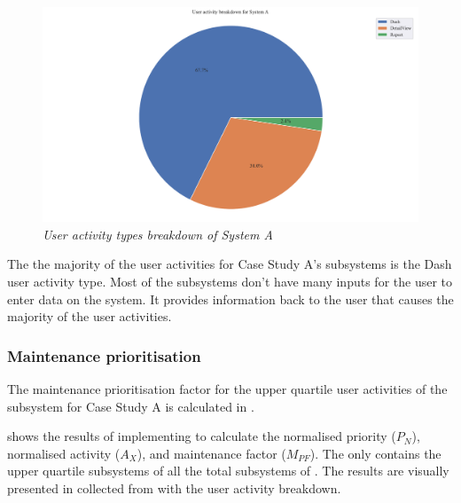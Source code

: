 \begin{figure}[!htb]
	\centering %
	\includegraphics[width=0.95\linewidth]{img/ch3/analysis/case_A_breakdown.pdf}
	\caption[User activity types breakdown of System A]
	{\textit{User activity types breakdown of System A}}\label{fig:ch3_caseABreakdown}
\end{figure} 

\clearpage

The  the majority of the user activities for Case Study A's subsystems is the Dash user activity type. Most of the subsystems don't have many inputs for the user to enter data on the system. It provides information back to the user that causes the majority of the user activities. 

\subsubsection{Maintenance prioritisation}
The maintenance prioritisation factor for the upper quartile user activities of the subsystem for Case Study A is calculated in .



 shows the results of implementing  to calculate the normalised priority ($P_N$), normalised activity ($A_X$), and maintenance factor ($M_{PF}$). The  only contains the upper quartile subsystems of all the total subsystems of . The results are visually presented in  collected from  with the user activity breakdown.

\clearpage

